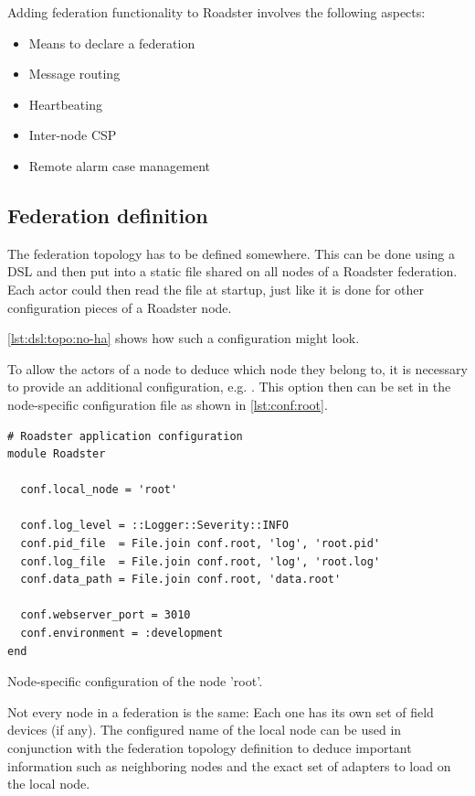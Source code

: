 Adding federation functionality to Roadster involves the following aspects:
\begin{itemize}
	\item Means to declare a federation
	\item Message routing
	\item Heartbeating
	\item Inter-node CSP
	\item Remote alarm case management
\end{itemize}

\subsection{Federation definition}
The federation topology has to be defined somewhere. This can be done using a
\gls{DSL} and then put into a static file shared
on all nodes of a Roadster federation. Each actor could then read the file at
startup, just like it is done for other configuration pieces of a Roadster node.

\autoref{lst:dsl:topo:no-ha} shows how such a configuration might look.

To allow the actors of a node to deduce which node they belong to, it is
necessary to provide an additional configuration, e.g. .
This option then can be set in the node-specific configuration file as shown in
\autoref{lst:conf:root}.

\begin{listing}
	\begin{verbatim}
# Roadster application configuration
module Roadster

  conf.local_node = 'root'

  conf.log_level = ::Logger::Severity::INFO
  conf.pid_file  = File.join conf.root, 'log', 'root.pid'
  conf.log_file  = File.join conf.root, 'log', 'root.log'
  conf.data_path = File.join conf.root, 'data.root'

  conf.webserver_port = 3010
  conf.environment = :development
end
	\end{verbatim}
	\caption{Node-specific configuration of the node 'root'.}
	\label{lst:conf:root}
\end{listing}

Not every node in a federation is the same: Each one has its own set of field devices (if any).
The configured name of the local node can be used in conjunction with the
federation topology definition to deduce important information such as neighboring
nodes and the exact set of adapters to load on the local node.

